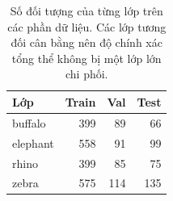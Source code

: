 \begin{table}[H]
\centering
\caption{Số đối tượng của từng lớp trên các phần dữ liệu. Các lớp tương đối cân bằng nên độ chính xác tổng thể không bị một lớp lớn chi phối.}
\label{tab:classes}
\small
\begin{tabular}{l r r r}
\toprule
Lớp & Train & Val & Test \\
\midrule
buffalo & 399 & 89 & 66 \\
elephant & 558 & 91 & 99 \\
rhino & 399 & 85 & 75 \\
zebra & 575 & 114 & 135 \\
\bottomrule
\end{tabular}
\end{table}
